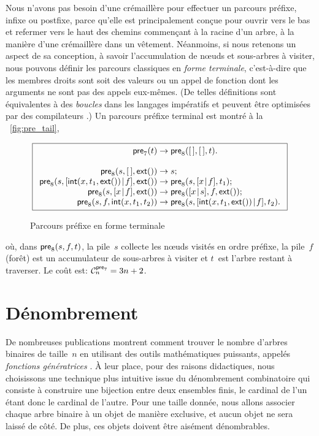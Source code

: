 Nous n'avons pas besoin d'une crémaillère pour effectuer un parcours préfixe, infixe ou
postfixe, parce qu'elle est principalement conçue pour ouvrir vers le
bas et refermer vers le haut des chemins commençant à la racine d'un
arbre, à la manière d'une crémaillère dans un vêtement. Néanmoins, si
nous retenons un aspect de sa conception, à savoir l'accumulation de
n{\oe}uds et sous-arbres à visiter, nous pouvons définir les parcours
classiques en \emph{forme terminale}, c'est-à-dire que les membres droits sont soit des
valeurs ou un appel de fonction dont les arguments ne sont pas des
appels eux-mêmes. (De telles définitions sont équivalentes à des
\emph{boucles} dans les langages impératifs et peuvent être optimisées
par des compilateurs \citep{Appel_1992}.) Un parcours préfixe terminal
est montré à la \fig~\vref{fig:pre_tail},
\begin{figure}[b]
\begin{equation*}
\boxed{
\begin{array}{r@{\;}c@{\;}l}
\fun{pre}_7(t) & \rightarrow & \fun{pre}_8(\el,\el,t).\\
\\
\fun{pre}_8(s,\el,\fun{ext}()) & \rightarrow & s;\\
\fun{pre}_8(s,\cons{\fun{int}(x,t_1,\fun{ext}())}{f},\fun{ext}()) &
\rightarrow & \fun{pre}_8(s,\cons{x}{f},t_1);\\
\fun{pre}_8(s,\cons{x}{f},\fun{ext}()) & \rightarrow &
\fun{pre}_8(\cons{x}{s},f,\fun{ext}());\\
\fun{pre}_8(s,f,\fun{int}(x,t_1,t_2)) & \rightarrow &
\fun{pre}_8(s,\cons{\fun{int}(x,t_1,\fun{ext}())}{f},t_2).
\end{array}}
\end{equation*}
\caption{Parcours préfixe en forme terminale\label{fig:pre_tail}}
\end{figure}
où, dans \(\fun{pre}_8(s,f,t)\), la pile~\(s\) collecte les n{\oe}uds
visités en ordre préfixe, la pile~\(f\) (forêt) est un accumulateur de
sous-arbres à visiter et \(t\)~est l'arbre restant à traverser. Le
coût est: \(\C{\fun{pre}_7}{n} = 3n + 2\).

\section{Dénombrement}

De nombreuses publications \cite[\S~2.3.4.4]{Knuth_1997}
\cite[chap.~5]{SedgewickFlajolet_1996} montrent comment trouver le
nombre d'arbres binaires de taille~\(n\) en utilisant des outils
mathématiques puissants, appelés \emph{fonctions génératrices}
\cite[chap.~7]{GrahamKnuthPatashnik_1994}. À leur place, pour des
raisons didactiques, nous choisissons une technique plus intuitive
issue du dénombrement combinatoire
qui consiste à construire une bijection entre deux ensembles finis, le
cardinal de l'un étant donc le cardinal de l'autre. Pour une taille
donnée, nous allons associer chaque arbre binaire à un objet de
manière exclusive, et aucun objet ne sera laissé de côté. De plus, ces
objets doivent être aisément dénombrables.


